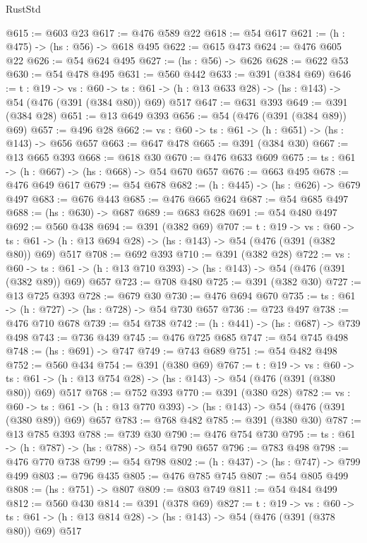 \begin{lexlean}{RustStd}
\begin{coremodule}
{\begin{coremodule}
{{{{{{{@615 := @603 @23
@617 := @476 @589 @22
@618 := @54 @617
@621 := (h : @475) -> (hs : @56) -> @618 @495
@622 := @615 @473
@624 := @476 @605 @22
@626 := @54 @624 @495
@627 := (hs : @56) -> @626
@628 := @622 @53
@630 := @54 @478 @495
@631 := @560 @442
@633 := @391 (@384 @69)
@646 := {t : @19} ->
  {vs : @60} ->
  {ts : @61} -> (h : @13 @633 @28) -> (hs : @143) -> @54 (@476 (@391 (@384 @80)) @69) @517
@647 := @631 @393
@649 := @391 (@384 @28)
@651 := @13 @649 @393
@656 := @54 (@476 (@391 (@384 @89)) @69)
@657 := @496 @28
@662 := {vs : @60} -> {ts : @61} -> (h : @651) -> (hs : @143) -> @656 @657
@663 := @647 @478
@665 := @391 (@384 @30)
@667 := @13 @665 @393
@668 := @618 @30
@670 := @476 @633 @609
@675 := {ts : @61} -> (h : @667) -> (hs : @668) -> @54 @670 @657
@676 := @663 @495
@678 := @476 @649 @617
@679 := @54 @678
@682 := (h : @445) -> (hs : @626) -> @679 @497
@683 := @676 @443
@685 := @476 @665 @624
@687 := @54 @685 @497
@688 := (hs : @630) -> @687
@689 := @683 @628
@691 := @54 @480 @497
@692 := @560 @438
@694 := @391 (@382 @69)
@707 := {t : @19} ->
  {vs : @60} ->
  {ts : @61} -> (h : @13 @694 @28) -> (hs : @143) -> @54 (@476 (@391 (@382 @80)) @69) @517
@708 := @692 @393
@710 := @391 (@382 @28)
@722 := {vs : @60} ->
  {ts : @61} -> (h : @13 @710 @393) -> (hs : @143) -> @54 (@476 (@391 (@382 @89)) @69) @657
@723 := @708 @480
@725 := @391 (@382 @30)
@727 := @13 @725 @393
@728 := @679 @30
@730 := @476 @694 @670
@735 := {ts : @61} -> (h : @727) -> (hs : @728) -> @54 @730 @657
@736 := @723 @497
@738 := @476 @710 @678
@739 := @54 @738
@742 := (h : @441) -> (hs : @687) -> @739 @498
@743 := @736 @439
@745 := @476 @725 @685
@747 := @54 @745 @498
@748 := (hs : @691) -> @747
@749 := @743 @689
@751 := @54 @482 @498
@752 := @560 @434
@754 := @391 (@380 @69)
@767 := {t : @19} ->
  {vs : @60} ->
  {ts : @61} -> (h : @13 @754 @28) -> (hs : @143) -> @54 (@476 (@391 (@380 @80)) @69) @517
@768 := @752 @393
@770 := @391 (@380 @28)
@782 := {vs : @60} ->
  {ts : @61} -> (h : @13 @770 @393) -> (hs : @143) -> @54 (@476 (@391 (@380 @89)) @69) @657
@783 := @768 @482
@785 := @391 (@380 @30)
@787 := @13 @785 @393
@788 := @739 @30
@790 := @476 @754 @730
@795 := {ts : @61} -> (h : @787) -> (hs : @788) -> @54 @790 @657
@796 := @783 @498
@798 := @476 @770 @738
@799 := @54 @798
@802 := (h : @437) -> (hs : @747) -> @799 @499
@803 := @796 @435
@805 := @476 @785 @745
@807 := @54 @805 @499
@808 := (hs : @751) -> @807
@809 := @803 @749
@811 := @54 @484 @499
@812 := @560 @430
@814 := @391 (@378 @69)
@827 := {t : @19} ->
  {vs : @60} ->
  {ts : @61} -> (h : @13 @814 @28) -> (hs : @143) -> @54 (@476 (@391 (@378 @80)) @69) @517
}}}}}}}
\end{coremodule}}
\end{coremodule}
\end{lexlean}

